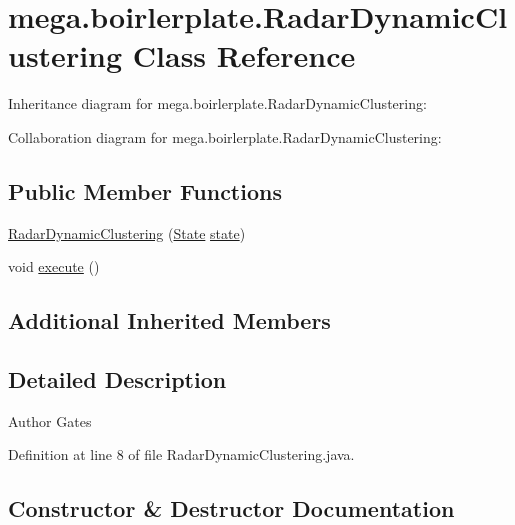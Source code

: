 \hypertarget{classmega_1_1boirlerplate_1_1_radar_dynamic_clustering}{}\section{mega.\+boirlerplate.\+Radar\+Dynamic\+Clustering Class Reference}
\label{classmega_1_1boirlerplate_1_1_radar_dynamic_clustering}


Inheritance diagram for mega.\+boirlerplate.\+Radar\+Dynamic\+Clustering\+:


Collaboration diagram for mega.\+boirlerplate.\+Radar\+Dynamic\+Clustering\+:
\subsection*{Public Member Functions}
\begin{DoxyCompactItemize}
\item 
\hyperlink{classmega_1_1boirlerplate_1_1_radar_dynamic_clustering_a50779fc81d17536ba1b072bc071202da}{Radar\+Dynamic\+Clustering} (\hyperlink{classmega_1_1boirlerplate_1_1_state}{State} \hyperlink{classmega_1_1boirlerplate_1_1_component_a87b0d70f323b5fee60a200e07c9c20fd}{state})
\item 
void \hyperlink{classmega_1_1boirlerplate_1_1_radar_dynamic_clustering_a27a165d0293cabed6a9c3fb1a6e0d7cb}{execute} ()
\end{DoxyCompactItemize}
\subsection*{Additional Inherited Members}


\subsection{Detailed Description}
\begin{DoxyAuthor}{Author}
Gates 
\end{DoxyAuthor}


Definition at line 8 of file Radar\+Dynamic\+Clustering.\+java.



\subsection{Constructor \& Destructor Documentation}
\mbox{\label{classmega_1_1boirlerplate_1_1_radar_dynamic_clustering_a50779fc81d17536ba1b072bc071202da}} 
